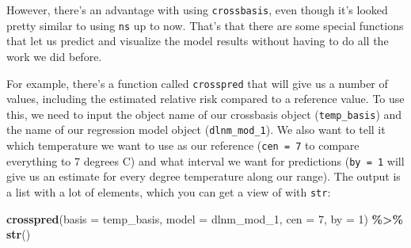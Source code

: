 \documentclass[
]{book}
\newenvironment{Shaded}{\begin{snugshade}}{\end{snugshade}}
\newcommand{\AttributeTok}[1]{\textcolor[rgb]{0.13,0.29,0.53}{#1}}
\newcommand{\DecValTok}[1]{\textcolor[rgb]{0.00,0.00,0.81}{#1}}
\newcommand{\FunctionTok}[1]{\textcolor[rgb]{0.13,0.29,0.53}{\textbf{#1}}}
\newcommand{\NormalTok}[1]{#1}
\newcommand{\SpecialCharTok}[1]{\textcolor[rgb]{0.81,0.36,0.00}{\textbf{#1}}}
\begin{document}
However, there's an advantage with using \texttt{crossbasis}, even though it's looked pretty similar
to using \texttt{ns} up to now. That's that there are some special functions that let us predict
and visualize the model results without having to do all the work we did before.

For example, there's a function called \texttt{crosspred} that will give us a number of values,
including the estimated relative risk compared to a reference value. To use this, we
need to input the object name of our crossbasis object (\texttt{temp\_basis}) and the name of our
regression model object (\texttt{dlnm\_mod\_1}). We also want to tell it which temperature we want
to use as our reference (\texttt{cen\ =\ 7} to compare everything to 7 degrees C) and what interval
we want for predictions (\texttt{by\ =\ 1} will give us an estimate for every degree temperature
along our range). The output is a list with a lot of elements, which you can get a view of
with \texttt{str}:

\begin{Shaded}
\begin{Highlighting}[]
\FunctionTok{crosspred}\NormalTok{(}\AttributeTok{basis =}\NormalTok{ temp\_basis, }\AttributeTok{model =}\NormalTok{ dlnm\_mod\_1, }\AttributeTok{cen =} \DecValTok{7}\NormalTok{, }\AttributeTok{by =} \DecValTok{1}\NormalTok{) }\SpecialCharTok{\%\textgreater{}\%} 
  \FunctionTok{str}\NormalTok{()}
\end{Highlighting}
\end{Shaded}
\end{document}
